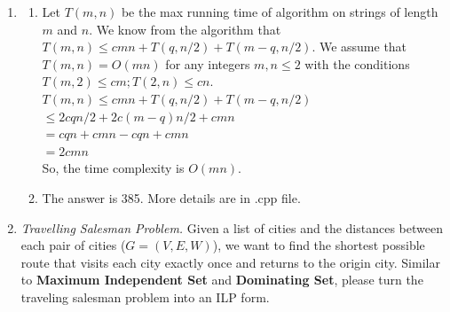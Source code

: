 \documentclass[12pt,a4paper]{article}
\makeatletter
\newtheorem*{solution}{Solution}
\theoremstyle{definition}
\renewenvironment{solution}[1][Solution] {\par\pushQED{\qed}\normalfont\topsep6\p@\@plus6\p@\relax\trivlist\item[\hskip\labelsep\bfseries#1\@addpunct{.}]\ignorespaces}{\popQED\endtrivlist\@endpefalse} \makeatother
\makeatother
\begin{document}
\begin{enumerate}
    \begin{solution}
      \begin{enumerate}
        \item Let $T(m,n)$ be the max running time of algorithm on strings of length $m$ and $n$. We know from the algorithm that $T(m,n)\leqslant cmn+T(q,n/2)+T(m-q,n/2)$. We assume that $T(m,n)=O(mn)$ for any integers $m,n\leqslant 2$ with the conditions $T(m,2)\leqslant cm;T(2,n)\leqslant cn$. 
        \\ $T(m,n)\leqslant cmn+T(q,n/2)+T(m-q,n/2)$
        \\ $\leqslant 2cqn/2+2c(m-q)n/2+cmn$
        \\ $=cqn+cmn-cqn+cmn$
        \\ $=2cmn$
        \\So, the time complexity is $O(mn)$.
        \item The answer is 385. More details are in .cpp file.
      \end{enumerate}
    \end{solution}
    
    \item 
    \textit{Travelling Salesman Problem.} Given a list of cities and the distances between each pair of cities ($ G=(V,E,W) $), we want to find the shortest possible route that visits each city exactly once and returns to the origin city. Similar to \textbf{Maximum Independent Set} and \textbf{Dominating Set}, please turn the traveling salesman problem into an ILP form.  
    

\end{enumerate}
\end{document}
